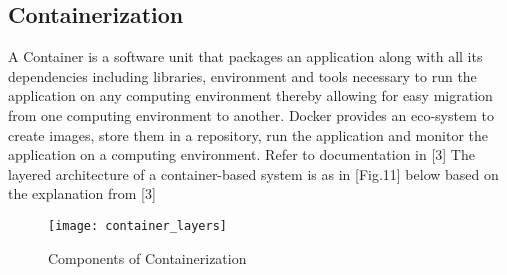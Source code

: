 \subsection{Containerization}

\begin{flushleft}
A Container is a software unit that packages an application along with all its dependencies including libraries, environment and tools necessary to run the application on any computing environment thereby allowing for easy migration from one computing environment to another. Docker provides an eco-system to create images, store them in a repository, run the application and monitor the application on a computing environment. Refer to documentation in [3]
The layered architecture of a container-based system is as in [Fig.11] below based on the explanation from [3]
\end{flushleft}

\begin{figure}
    \centering
    \texttt{[image: container\_layers]}
    \label{fig:figure10}
    \caption{Components of Containerization}
\end{figure}

